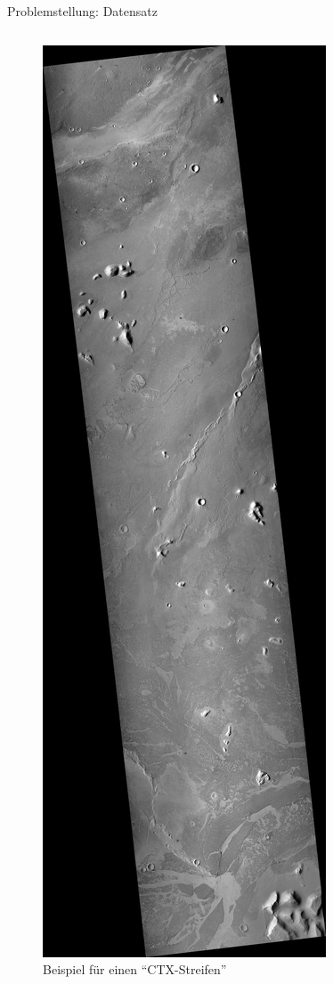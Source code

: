 \documentclass[9pt]{beamer}
\begin{document}
\begin{frame}{Problemstellung: Datensatz}
\begin{columns}
\begin{column}{.3\textwidth}
\begin{figure}[H]
				\includegraphics[height=.8\textheight, keepaspectratio]{P03-2.jpg}
				\caption{Beispiel für einen \enquote{CTX-Streifen}\cite{doi:10.1029/2006JE002808}}
			\end{figure}
		\end{column}
	\end{columns}	
\end{frame}
\end{document}

